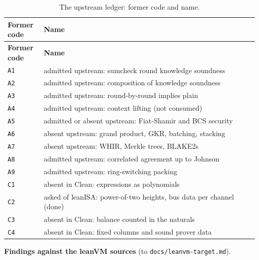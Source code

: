 {\footnotesize\setlength{\tabcolsep}{3pt}
\begin{longtable}{@{}>{\raggedright\arraybackslash}p{0.147\linewidth}>{\raggedright\arraybackslash}p{0.835\linewidth}@{}}
\caption{The upstream ledger: former code and name.}\label{tab:docs-map-ledger}\\
\toprule
\textbf{Former code} & \textbf{Name} \\
\midrule
\endfirsthead
\toprule
\textbf{Former code} & \textbf{Name} \\
\midrule
\endhead
\bottomrule
\endfoot
\texttt{A1} & admitted upstream: sumcheck round knowledge soundness \\\addlinespace[2pt]
\texttt{A2} & admitted upstream: composition of knowledge soundness \\\addlinespace[2pt]
\texttt{A3} & admitted upstream: round-by-round implies plain \\\addlinespace[2pt]
\texttt{A4} & admitted upstream: context lifting (not consumed) \\\addlinespace[2pt]
\texttt{A5} & admitted or absent upstream: Fiat-Shamir and BCS security \\\addlinespace[2pt]
\texttt{A6} & absent upstream: grand product, GKR, batching, stacking \\\addlinespace[2pt]
\texttt{A7} & absent upstream: WHIR, Merkle trees, BLAKE2s \\\addlinespace[2pt]
\texttt{A8} & admitted upstream: correlated agreement up to Johnson \\\addlinespace[2pt]
\texttt{A9} & admitted upstream: ring-switching packing \\\addlinespace[2pt]
\texttt{C1} & absent in Clean: expressions as polynomials \\\addlinespace[2pt]
\texttt{C2} & asked of leanISA: power-of-two heights, bus data per channel (done) \\\addlinespace[2pt]
\texttt{C3} & absent in Clean: balance counted in the naturals \\\addlinespace[2pt]
\texttt{C4} & absent in Clean: fixed columns and sound prover data \\
\end{longtable}}

\textbf{Findings against the leanVM sources} (to \texttt{docs/\allowbreak{}leanvm-\allowbreak{}target.\allowbreak{}md}).

